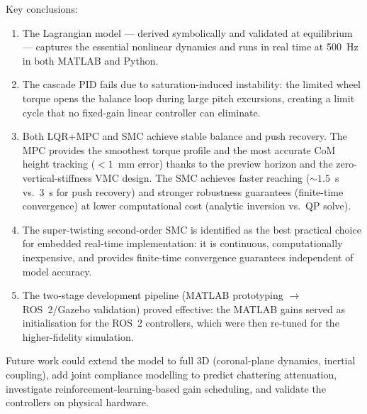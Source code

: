 \documentclass[11pt,a4paper]{article}
\begin{document}
Key conclusions:
\begin{enumerate}
    \item The Lagrangian model --- derived symbolically and validated at equilibrium ---
          captures the essential nonlinear dynamics and runs in real time at 500~Hz in both
          MATLAB and Python.
    \item The cascade PID fails due to saturation-induced instability: the limited wheel
          torque opens the balance loop during large pitch excursions, creating a limit cycle
          that no fixed-gain linear controller can eliminate.
    \item Both LQR+MPC and SMC achieve stable balance and push recovery.  The MPC provides
          the smoothest torque profile and the most accurate CoM height tracking
          ($< 1$~mm error) thanks to the preview horizon and the zero-vertical-stiffness VMC
          design.  The SMC achieves faster reaching ($\sim 1.5$~s vs.\ 3~s for push
          recovery) and stronger robustness guarantees (finite-time convergence) at lower
          computational cost (analytic inversion vs.\ QP solve).
    \item The super-twisting second-order SMC is identified as the best practical choice for
          embedded real-time implementation: it is continuous, computationally inexpensive,
          and provides finite-time convergence guarantees independent of model accuracy.
    \item The two-stage development pipeline (MATLAB prototyping $\to$ ROS~2/Gazebo
          validation) proved effective: the MATLAB gains served as initialisation for the
          ROS~2 controllers, which were then re-tuned for the higher-fidelity simulation.
\end{enumerate}

Future work could extend the model to full 3D (coronal-plane dynamics, inertial coupling),
add joint compliance modelling to predict chattering attenuation, investigate
reinforcement-learning-based gain scheduling, and validate the controllers on physical
hardware.
\end{document}
